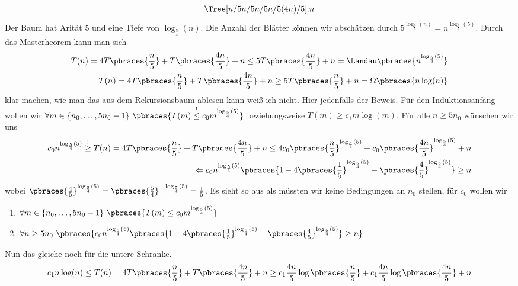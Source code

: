\begin{solution}	
	\begin{align*}
	\Tree [n/5 n/5 n/5 n/5 (4n)/5 ].n
	\end{align*}
	Der Baum hat Arität $5$ und eine Tiefe von $\log_{\frac{5}{4}}(n)$. Die Anzahl der Blätter können wir abschätzen durch $5^{\log_\frac{5}{4}(n)} = n^{\log_{\frac{5}{4}}(5)}$. Durch das Masterheorem kann man sich 
	\begin{align*}
	T(n) = 4 T\pbraces{\frac{n}{5}} + T\pbraces{\frac{4n}{5}} + n \leq 5 T\pbraces{\frac{4n}{5}} + n = \Landau\pbraces{n^{\log_\frac{5}{4}(5)}} \\
	T(n) = 4 T\pbraces{\frac{n}{5}} + T\pbraces{\frac{4n}{5}} + n \geq 5 T\pbraces{\frac{n}{5}} + n = \Omega\pbraces{n\log(n)}
	\end{align*} 
	klar machen, wie man das aus dem Rekursionsbaum ablesen kann weiß ich nicht. Hier jedenfalls der Beweis.
	Für den Induktionsanfang wollen wir $\forall m \in \{n_0, \dots, 5n_0 - 1\} \ \pbraces{T(m) \stackrel{!}{\leq} c_0 m^{\log_\frac{5}{4}(5)}}$ beziehungsweise $T(m) \geq c_1 m \log(m)$.
	Für alle $n \geq 5n_0$ wünschen wir uns
	\begin{align*}
	c_0 n^{\log_\frac{5}{4}(5)} \stackrel{!}{\geq} T(n) = 4 T\pbraces{\frac{n}{5}} + T\pbraces{\frac{4n}{5}} + n \leq 4 c_0 \pbraces{\frac{n}{5}}^{\log_\frac{5}{4}(5)} + c_0 \pbraces{\frac{4n}{5}}^{\log_\frac{5}{4}(5)} + n \\
	\Leftarrow c_0 n^{\log_{\frac{5}{4}}(5)} \pbraces{1 - 4  \pbraces{\frac{1}{5}}^{\log_\frac{5}{4}(5)} - \pbraces{\frac{4}{5}}^{\log_\frac{5}{4}(5)}} \geq n 
	\end{align*}
	wobei $\pbraces{\frac{4}{5}}^{\log_\frac{5}{4}(5)} = \pbraces{\frac{5}{4}}^{-\log_\frac{5}{4}(5)} = \frac{1}{5}$.
	Es sieht so aus als müssten wir keine Bedingungen an $n_0$ stellen, für $c_0$ wollen wir
	\begin{enumerate}
		\item $\forall m \in \{n_0, \dots, 5n_0 - 1\} \ \pbraces{T(m) \leq c_0 m^{\log_\frac{5}{4}(5)}}$
		\item $\forall n \geq 5n_0 \ \pbraces{c_0 n^{\log_{\frac{5}{4}}(5)} \pbraces{1 - 4  \pbraces{\frac{1}{5}}^{\log_\frac{5}{4}(5)} - \pbraces{\frac{4}{5}}^{\log_\frac{5}{4}(5)}} \geq n}$
	\end{enumerate}
	Nun das gleiche noch für die untere Schranke. 
	\begin{align*}
	c_1 n\log(n) \leq T(n) = 4 T\pbraces{\frac{n}{5}} + T\pbraces{ \frac{4n}{5}} + n \geq c_1 \frac{4n}{5} \log\pbraces{\frac{n}{5}} + c_1 \frac{4n}{5} \log\pbraces{\frac{4n}{5}} + n \\

\end{align*}
\end{solution}
